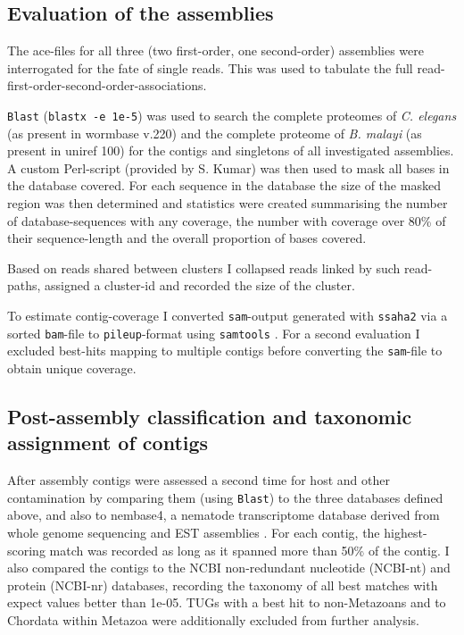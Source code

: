 \subsection{Evaluation of the assemblies}

The ace-files for all three (two first-order, one second-order)
assemblies were interrogated for the fate of single reads. This was
used to tabulate the full read-first-order-second-order-associations.

\texttt{Blast} (\texttt{blastx -e 1e-5}) was used to search the
complete proteomes of \textit{C. elegans} (as present in wormbase
v.220) and the complete proteome of \textit{B. malayi} (as present in
uniref 100) for the contigs and singletons of all investigated
assemblies. A custom Perl-script (provided by S. Kumar) was then used
to mask all bases in the database covered. For each sequence in the
database the size of the masked region was then determined and
statistics were created summarising the number of database-sequences
with any coverage, the number with coverage over 80\% of their
sequence-length and the overall proportion of bases covered.

Based on reads shared between clusters I collapsed reads linked by
such read-paths, assigned a cluster-id and recorded the size of the
cluster.

To estimate contig-coverage I converted \texttt{sam}-output generated
with \texttt{ssaha2}\cite{pmid11591649} via a sorted \texttt{bam}-file
to \texttt{pileup}-format using \texttt{samtools}
\cite{journals/bioinformatics/LiHWFRHMAD09}. For a second evaluation
I excluded best-hits mapping to multiple contigs before converting the
\texttt{sam}-file to obtain unique coverage.

\subsection{Post-assembly classification and taxonomic assignment of
  contigs}

After assembly contigs were assessed a second time for host and other
contamination by comparing them (using \texttt{Blast}) to the three
databases defined above, and also to nembase4, a nematode
transcriptome database derived from whole genome sequencing and EST
assemblies \cite{parkinson_nembase:resource_2004, pmid21550347}. For
each contig, the highest-scoring match was recorded as long as it
spanned more than 50\% of the contig. I also compared the contigs to
the NCBI non-redundant nucleotide (NCBI-nt) and protein (NCBI-nr)
databases, recording the taxonomy of all best matches with expect
values better than 1e-05. TUGs with a best hit to non-Metazoans and to
Chordata within Metazoa were additionally excluded from further
analysis.

